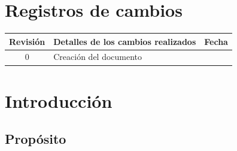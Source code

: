 \documentclass[
  11pt, %
  codirector, %
]{charter}
\begin{document}
\maketitle
\tableofcontents

\newpage

\section*{Registros de cambios}
\label{sec:registro}


\begin{table}[ht]
	\label{tab:registro}
	\centering
	\begin{tabularx}{\linewidth}{@{}|c|X|c|@{}}
		\hline
		\rowcolor[HTML]{C0C0C0}
		Revisión & \multicolumn{1}{c|}{\cellcolor[HTML]{C0C0C0}Detalles de los cambios realizados} & Fecha      \\ \hline
		0      & Creación del documento                                 &\fechaInicioName \\ \hline
		\hline

	\end{tabularx}
	\label{sec:cierre}
\end{table}

\pagebreak


\section{Introducción}
\label{sec:org60390fa}



\subsection{Propósito}
\label{sec:org434c3ef}

\end{document}
